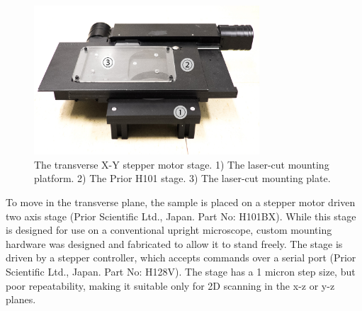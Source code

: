 \begin{figure}[h!]
\centering
\includegraphics[width=0.75\textwidth]{Images/Photographs/DSCF1722_an.jpg}
\caption[The transverse X-Y stepper motor stage.]{The transverse X-Y stepper motor stage. 1) The laser-cut mounting platform. 2) The Prior H101 stage. 3) The laser-cut mounting plate.}
\end{figure}

To move in the transverse plane, the sample is placed on a stepper motor driven two axis stage (Prior Scientific Ltd., Japan. Part No: H101BX). While this stage is designed for use on a conventional upright microscope, custom mounting hardware was designed and fabricated to allow it to stand freely. The stage is driven by a stepper controller, which accepts commands over a serial port (Prior Scientific Ltd., Japan. Part No: H128V). The stage has a 1 micron step size, but poor repeatability, making it suitable only for 2D scanning in the x-z or y-z planes.




